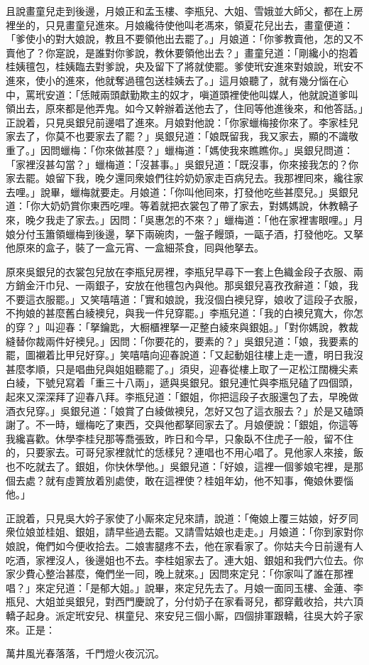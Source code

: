 且說畫童兒走到後邊，月娘正和孟玉樓、李瓶兒、大姐、雪娥並大師父，都在上房裡坐的，只見畫童兒進來。月娘纔待使他叫老馮來，領夏花兒出去，畫童便道：「爹使小的對大娘說，教且不要領他出去罷了。」月娘道：「你爹教賣他，怎的又不賣他了？你寔說，是誰對你爹說，教休要領他出去？」畫童兒道：「剛纔小的抱着桂姨氊包，桂姨臨去對爹說，央及留下了將就使罷。爹使玳安進來對娘說，玳安不進來，使小的進來，他就奪過氊包送桂姨去了。」這月娘聽了，就有幾分惱在心中，罵玳安道：「恁賊兩頭獻勤欺主的奴才，嗔道頭裡使他叫媒人，他就說道爹叫領出去，原來都是他弄鬼。如今又幹辦着送他去了，住囘等他進後來，和他答話。」正說着，只見吳銀兒前邊唱了進來。月娘對他說：「你家蠟梅接你來了。李家桂兒家去了，你莫不也要家去了罷？」吳銀兒道：「娘既留我，我又家去，顯的不識敬重了。」因問蠟梅：「你來做甚麼？」蠟梅道：「媽使我來瞧瞧你。」吳銀兒問道：「家裡沒甚勾當？」蠟梅道：「沒甚事。」吳銀兒道：「既沒事，你來接我怎的？你家去罷。娘留下我，晚夕還同衆娘們往妗奶奶家走百病兒去。我那裡囘來，纔往家去哩。」說畢，蠟梅就要走。月娘道：「你叫他囘來，打發他吃些甚麼兒。」吳銀兒道：「你大奶奶賞你東西吃哩。等着就把衣裳包了帶了家去，對媽媽說，休教轎子來，晚夕我走了家去。」因問：「吳惠怎的不來？」蠟梅道：「他在家裡害眼哩。」月娘分付玉簫領蠟梅到後邊，拏下兩碗肉，一盤子饅頭，一甌子酒，打發他吃。又拏他原來的盒子，裝了一盒元宵、一盒細茶食，囘與他拏去。

原來吳銀兒的衣裳包兒放在李瓶兒房裡，李瓶兒早尋下一套上色織金段子衣服、兩方銷金汗巾兒、一兩銀子，安放在他氊包內與他。那吳銀兒喜孜孜辭道：「娘，我不要這衣服罷。」又笑嘻嘻道：「實和娘說，我沒個白襖兒穿，娘收了這段子衣服，不拘娘的甚麼舊白綾襖兒，與我一件兒穿罷。」李瓶兒道：「我的白襖兒寬大，你怎的穿？」叫迎春：「拏鑰匙，大橱櫃裡拏一疋整白綾來與銀姐。」「對你媽說，教裁縫替你裁兩件好襖兒。」因問：「你要花的，要素的？」吳銀兒道：「娘，我要素的罷，圖襯着比甲兒好穿。」笑嘻嘻向迎春說道：「又起動姐往樓上走一遭，明日我沒甚麼孝順，只是唱曲兒與姐姐聽罷了。」須臾，迎春從樓上取了一疋松江闊機尖素白綾，下號兒寫着「重三十八兩」，遞與吳銀兒。銀兒連忙與李瓶兒磕了四個頭，起來又深深拜了迎春八拜。李瓶兒道：「銀姐，你把這段子衣服還包了去，早晚做酒衣兒穿。」吳銀兒道：「娘賞了白綾做襖兒，怎好又包了這衣服去？」於是又磕頭謝了。不一時，蠟梅吃了東西，交與他都拏囘家去了。月娘便說：「銀姐，你這等我纔喜歡。休學李桂兒那等喬張致，昨日和今早，只象臥不住虎子一般，留不住的，只要家去。可哥兒家裡就忙的恁樣兒？連唱也不用心唱了。見他家人來接，飯也不吃就去了。銀姐，你快休學他。」吳銀兒道：「好娘，這裡一個爹娘宅裡，是那個去處？就有虛篢放着別處使，敢在這裡使？桂姐年幼，他不知事，俺娘休要惱他。」{}

正說着，只見吳大妗子家使了小厮來定兒來請，說道：「俺娘上覆三姑娘，好歹同衆位娘並桂姐、銀姐，請早些過去罷。又請雪姑娘也走走。」月娘道：「你到家對你娘說，俺們如今便收拾去。二娘害腿疼不去，他在家看家了。你姑夫今日前邊有人吃酒，家裡沒人，後邊姐也不去。李桂姐家去了。連大姐、銀姐和我們六位去。你家少費心整治甚麼，俺們坐一囘，晚上就來。」因問來定兒：「你家叫了誰在那裡唱？」來定兒道：「是郁大姐。」說畢，來定兒先去了。月娘一面同玉樓、金蓮、李瓶兒、大姐並吳銀兒，對西門慶說了，分付奶子在家看哥兒，都穿戴收拾，共六頂轎子起身。派定玳安兒、棋童兒、來安兒三個小厮，四個排軍跟轎，往吳大妗子家來。正是：

\begin{myquote}
萬井風光春落落，千門燈火夜沉沉。
\end{myquote}


